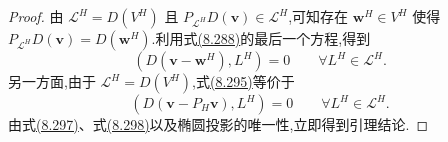 \begin{proof}
由 $\mathcal L^H=D(V^H)$ 且 $P_{\mathcal L^H}D(\bm v)\in\mathcal L^H$,可知存在 $\bm w^H\in V^H$ 使得
$P_{\mathcal L^H}D(\bm v)=D(\bm w^H)$.利用式\hyperref[eq:vms-coarse-projection-three-scale-method]{(8.288)}的最后一个方程,得到
\begin{equation}\label{eq:vms-coarse-projection-proof-one}
 (D(\bm v-\bm w^H),L^H)=0
 \qquad\forall L^H\in\mathcal L^H.
\end{equation}
另一方面,由于 $\mathcal L^H=D(V^H)$,式\hyperref[eq:vms-coarse-projection-large-scales]{(8.295)}等价于
\begin{equation}\label{eq:vms-coarse-projection-proof-two}
 (D(\bm v-P_H\bm v),L^H)=0
 \qquad\forall L^H\in\mathcal L^H.
\end{equation}
由式\hyperref[eq:vms-coarse-projection-proof-one]{(8.297)}、式\hyperref[eq:vms-coarse-projection-proof-two]{(8.298)}以及椭圆投影的唯一性,立即得到引理结论.
\end{proof}

